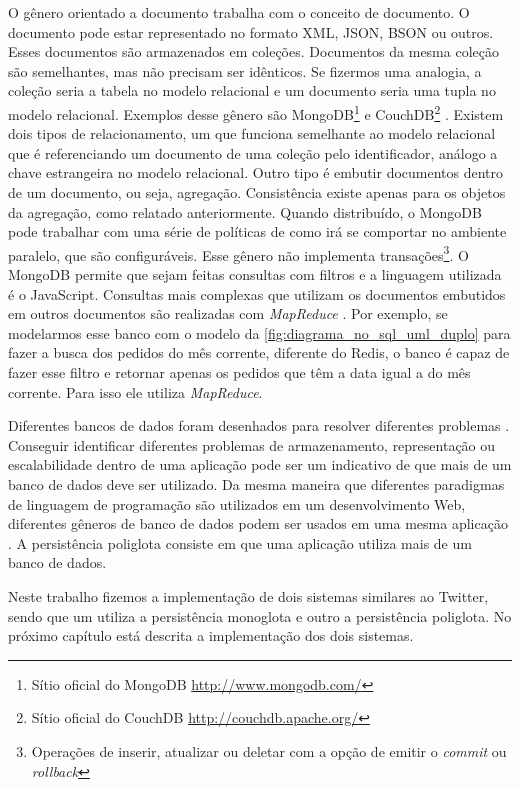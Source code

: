 O gênero orientado a documento trabalha com o conceito de documento. O documento pode estar representado no formato \ac{XML}, JSON, BSON ou outros. Esses documentos são armazenados em coleções. Documentos da mesma coleção são semelhantes, mas não precisam ser idênticos. Se fizermos uma analogia, a coleção seria a tabela no modelo relacional e um documento seria uma tupla no modelo relacional. Exemplos desse gênero são MongoDB\footnote{Sítio oficial do MongoDB \url{http://www.mongodb.com/}} e CouchDB\footnote{Sítio oficial do CouchDB \url{http://couchdb.apache.org/}} \cite{NoSQL}.
Existem dois tipos de relacionamento, um que funciona semelhante ao modelo relacional que é referenciando um documento de uma coleção pelo identificador, análogo a chave estrangeira no modelo relacional. Outro tipo é embutir documentos dentro de um documento, ou seja, agregação. Consistência existe apenas para os objetos da agregação, como relatado anteriormente. Quando distribuído, o MongoDB pode trabalhar com uma série de políticas de como irá se comportar no ambiente paralelo, que são configuráveis. Esse gênero não implementa transações\footnote{Operações de inserir, atualizar ou deletar com a opção de emitir o \textit{commit} ou \textit{rollback}}. O MongoDB permite que sejam feitas consultas com filtros e a linguagem utilizada é o JavaScript. Consultas mais complexas que utilizam os documentos embutidos em outros documentos são realizadas com \textit{MapReduce} \cite{NoSQL}. Por exemplo, se modelarmos esse banco com o modelo da \autoref{fig:diagrama_no_sql_uml_duplo} para fazer a busca dos pedidos do mês corrente, diferente do \ac{Redis}, o banco é capaz de fazer esse filtro e retornar apenas os pedidos que têm a data igual a do mês corrente. Para isso ele utiliza \textit{MapReduce}.

Diferentes bancos de dados foram desenhados para resolver diferentes problemas \cite{NoSQL}. Conseguir identificar diferentes problemas de armazenamento, representação ou escalabilidade dentro de uma aplicação pode ser um indicativo de que mais de um banco de dados deve ser utilizado. Da mesma maneira que diferentes paradigmas de linguagem de programação são utilizados em um desenvolvimento Web, diferentes gêneros de banco de dados podem ser usados em uma mesma aplicação \cite{multiparadigma}. A persistência poliglota consiste em que uma aplicação utiliza mais de um banco de dados.

Neste trabalho fizemos a implementação de dois sistemas similares ao Twitter, sendo que um utiliza a persistência monoglota e outro a persistência poliglota. No próximo capítulo está descrita a implementação dos dois sistemas.


